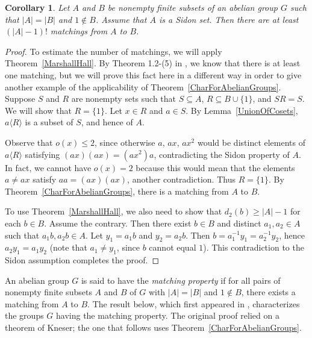 \documentclass[11pt]{amsart}
\newtheorem{corollary}[theorem]{Corollary}
\theoremstyle{definition}
\theoremstyle{remark}
\begin{document}
\begin{corollary}
Let \( A \) and \( B \) be nonempty finite subsets of an abelian group \( G \) such that \( |A| = |B| \) and \( 1 \notin B \). Assume that \( A \) is a Sidon set. Then there are at least \( (|A| - 1)! \) matchings from \( A \) to \( B \).
\end{corollary}

\begin{proof}
To estimate the number of matchings, we will apply Theorem~\ref{MarshallHall}. By Theorem 1.2-(5) in \cite{Aliabadi 2}, we know that there is at least one matching, but we will prove this fact here in a different way in order to give another example of the applicability of Theorem~\ref{CharForAbelianGroups}. Suppose \( S \) and \( R \) are nonempty sets such that \( S \subseteq A \), \( R \subseteq B \cup \{ 1 \} \), and \( SR = S \). We will show that \( R = \{ 1 \} \).  Let \( x \in R \) and \( a \in S \). By Lemma~\ref{UnionOfCosets}, \( a \langle R \rangle \) is a subset of \( S \), and hence of \( A \).

Observe that \( o(x) \leq  2 \), since otherwise \( a\), \( ax \), \( ax^2 \) would be distinct elements of \( a \langle R \rangle \) satisfying \( (ax)(ax) = (ax^2)a \), contradicting the Sidon property of \( A \).  In fact, we cannot have \( o(x) = 2 \) because this would mean that the elements \( a \neq ax \) satisfy \( aa = (ax)(ax) \), another contradiction. Thus \( R = \{ 1 \} \). By Theorem~\ref{CharForAbelianGroups}, there is a matching from \( A \) to \( B \).

To use Theorem~\ref{MarshallHall}, we also need to show that \( d_2(b) \geq |A| - 1 \) for each \( b \in B \). Assume the contrary. Then there exist \( b \in B \) and distinct \( a_1 , a_2 \in A \) such that \(  a_1b, a_2b \in A \).  Let \( y_1 = a_1b \) and \( y_2 = a_2b \).  Then \( b = a_1^{-1} y_1 = a_2^{-1} y_2 \), hence \( a_2 y_1 = a_1 y_2 \) (note that  \( a_1 \neq y_1 \), since \( b \) cannot equal \( 1 \)).  This contradiction to the Sidon assumption completes the proof.
\end{proof}


An abelian group \( G \) is said to have the {\em matching property} if for all pairs of nonempty finite subsets \( A \) and \( B \) of \( G \) with \( |A| = |B| \) and \( 1 \notin B \), there exists a matching from \( A \) to \( B \).  The result below, which first appeared in \cite{Losonczy 2}, characterizes the groups \( G \) having the matching property. The original proof relied on a theorem of Kneser; the one that follows uses Theorem~\ref{CharForAbelianGroups}. 
\end{document}
